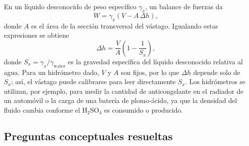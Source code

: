 \figuraHidrometroComparacion

En un líquido desconocido de peso específico $\gamma_x$, un balance de fuerzas da
$$ W = \gamma_x (V - A\,\Delta h), $$
donde $A$ es el área de la sección transversal del vástago. Igualando estas expresiones se obtiene
$$ \Delta h = \frac{V}{A}\left(1 - \frac{1}{S_x}\right), $$
donde $S_x = \gamma_x/\gamma_{\mathrm{water}}$ es la gravedad específica del líquido desconocido relativa al agua. Para un hidrómetro dado, $V$ y $A$ son fijos, por lo que $\Delta h$ depende solo de $S_x$; así, el vástago puede calibrarse para leer directamente $S_x$. Los hidrómetros se utilizan, por ejemplo, para medir la cantidad de anticongelante en el radiador de un automóvil o la carga de una batería de plomo-ácido, ya que la densidad del fluido cambia conforme el $\mathrm{H_2SO_4}$ es consumido o producido.

\subsection{Preguntas conceptuales resueltas}

